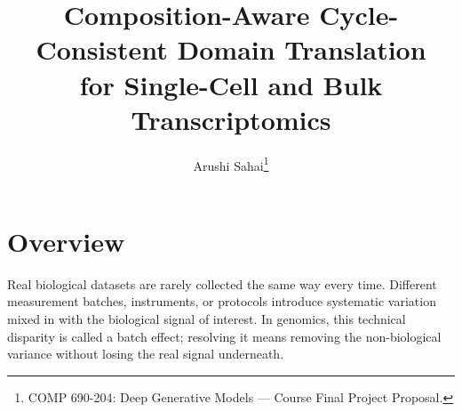 
\title{Composition-Aware Cycle-Consistent Domain Translation \\ for Single-Cell and Bulk Transcriptomics}
\author{Arushi Sahai\thanks{COMP 690-204: Deep Generative Models --- Course Final Project Proposal.}}


\maketitle

\setlength{\abovedisplayskip}{3pt}
\setlength{\belowdisplayskip}{3pt}
\setlength{\abovedisplayshortskip}{2pt}
\setlength{\belowdisplayshortskip}{2pt}
\setlength{\textfloatsep}{6pt plus 1pt minus 1pt}
\setlength{\abovecaptionskip}{3pt}
\setlength{\belowcaptionskip}{2pt}

\section{Overview}
Real biological datasets are rarely collected the same way every time. Different measurement batches, instruments,
or protocols introduce systematic variation mixed in with the biological signal of interest. In genomics,
this technical disparity is called a batch effect; resolving it means removing the non-biological variance
without losing the real signal underneath.

